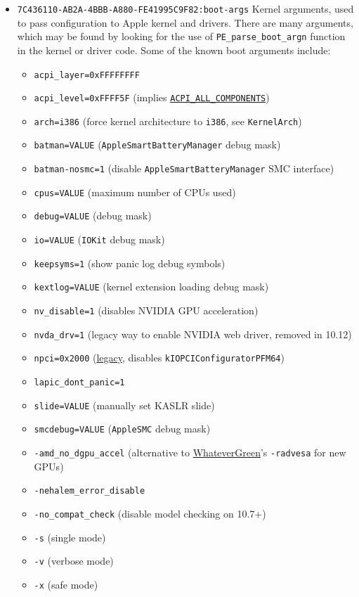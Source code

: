 \documentclass[]{article}
\providecommand{\tightlist}{%
  \setlength{\itemsep}{0pt}\setlength{\parskip}{0pt}}
\begin{document}
\begin{itemize}
\tightlist
\item
  \texttt{7C436110-AB2A-4BBB-A880-FE41995C9F82:boot-args}
  \break
  Kernel arguments, used to pass configuration to Apple kernel and drivers.
  There are many arguments, which may be found by looking for the use of
  \texttt{PE\_parse\_boot\_argn} function in the kernel or driver code.
  Some of the known boot arguments include:

  \begin{itemize}
  \item \texttt{acpi\_layer=0xFFFFFFFF}
  \item \texttt{acpi\_level=0xFFFF5F} (implies
    \href{https://github.com/acpica/acpica/blob/master/source/include/acoutput.h}
    {\texttt{ACPI\_ALL\_COMPONENTS}})
  \item \texttt{arch=i386} (force kernel architecture to \texttt{i386}, see \texttt{KernelArch})
  \item \texttt{batman=VALUE} (\texttt{AppleSmartBatteryManager} debug mask)
  \item \texttt{batman-nosmc=1} (disable \texttt{AppleSmartBatteryManager} SMC interface)
  \item \texttt{cpus=VALUE} (maximum number of CPUs used)
  \item \texttt{debug=VALUE} (debug mask)
  \item \texttt{io=VALUE} (\texttt{IOKit} debug mask)
  \item \texttt{keepsyms=1} (show panic log debug symbols)
  \item \texttt{kextlog=VALUE} (kernel extension loading debug mask)
  \item \texttt{nv\_disable=1} (disables NVIDIA GPU acceleration)
  \item \texttt{nvda\_drv=1} (legacy way to enable NVIDIA web driver, removed in 10.12)
  \item \texttt{npci=0x2000} (\href{https://www.insanelymac.com/forum/topic/260539-1068-officially-released/?do=findComment&comment=1707972}{legacy}, disables \texttt{kIOPCIConfiguratorPFM64})
  \item \texttt{lapic\_dont\_panic=1}
  \item \texttt{slide=VALUE} (manually set KASLR slide)
  \item \texttt{smcdebug=VALUE} (\texttt{AppleSMC} debug mask)
  \item \texttt{-amd\_no\_dgpu\_accel} (alternative to \href{https://github.com/acidanthera/WhateverGreen}{WhateverGreen}'s \texttt{-radvesa} for new GPUs)
  \item \texttt{-nehalem\_error\_disable}
  \item \texttt{-no\_compat\_check} (disable model checking on 10.7+)
  \item \texttt{-s} (single mode)
  \item \texttt{-v} (verbose mode)
  \item \texttt{-x} (safe mode)
  \end{itemize}


\end{itemize}
\end{document}
